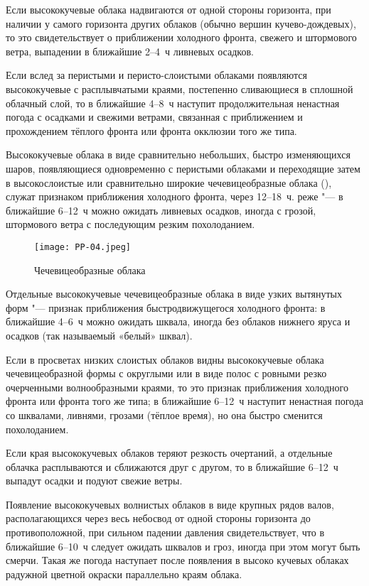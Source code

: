  Если высококучевые облака надвигаются от одной стороны
горизонта, при наличии у самого горизонта других облаков (обычно
вершин кучево-дождевых), то это свидетельствует о приближении
холодного фронта, свежего и штормового ветра, выпадении в ближайшие
2--4~ч ливневых осадков.

 Если вслед за перистыми и перисто-слоистыми облаками появляются
высококучевые с расплывчатыми краями, постепенно сливающиеся в
сплошной облачный слой, то в ближайшие 4--8~ч наступит
продолжительная ненастная погода с осадками и свежими ветрами,
связанная с приближением и прохождением тёплого фронта или фронта
окклюзии того же типа.

 Высококучевые облака в виде сравнительно небольших, быстро
изменяющихся шаров, появляющиеся одновременно с перистыми облаками и
переходящие затем в высокослоистые или сравнительно широкие
чечевицеобразные облака (), служат признаком приближения
холодного фронта, через 12--18~ч. реже "--- в ближайшие 6--12~ч
можно ожидать ливневых осадков, иногда с грозой, штормового ветра с
последующим резким похолоданием.

\begin{figure}[htb]
  \centering{}
  \texttt{[image: PP-04.jpeg]}
  \caption{Чечевицеобразные облака}
  \label{fig:pp04}
  \small
  \centering{}
\end{figure}

 Отдельные высококучевые чечевицеобразные облака в виде узких
вытянутых форм "--- признак приближения быстродвижущегося холодного
фронта: в ближайшие 4--6~ч можно ожидать шквала, иногда без
облаков нижнего яруса и осадков (так называемый «белый» шквал).

 Если в просветах низких слоистых облаков видны высококучевые
облака чечевицеобразной формы с округлыми или в виде полос с ровными
резко очерченными волнообразными краями, то это признак приближения
холодного фронта или фронта того же типа; в ближайшие 6--12~ч наступит
ненастная погода со шквалами, ливнями, грозами (тёплое время), но она
быстро сменится похолоданием.

 Если края высококучевых облаков теряют резкость очертаний, а
отдельные облачка расплываются и сближаются друг с другом, то в
ближайшие 6--12~ч выпадут осадки и подуют свежие ветры.

 Появление высококучевых волнистых облаков в виде крупных рядов
валов, располагающихся через весь небосвод от одной стороны горизонта
до противоположной, при сильном падении давления свидетельствует, что
в ближайшие 6--10~ч следует ожидать шквалов и гроз, иногда при этом
могут быть смерчи. Такая же погода наступает после появления в высоко
кучевых облаках радужной цветной окраски параллельно краям облака.

